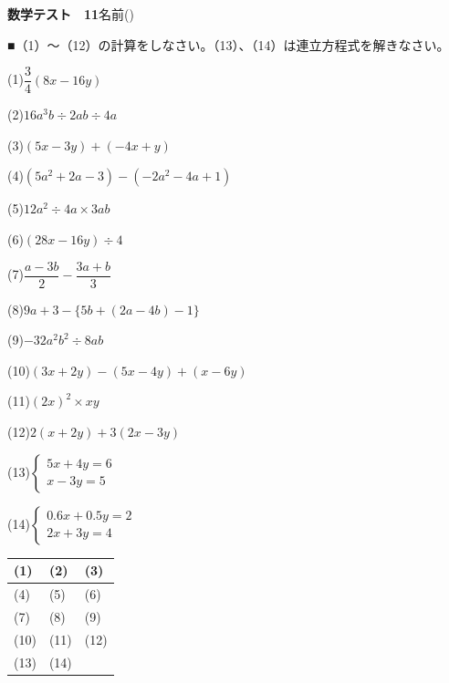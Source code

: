 \documentclass[a4paper,11pt]{ltjsarticle}
\newlength{\qcol}\setlength{\qcol}{0.47\textwidth}
\newlength{\qgap}
\newlength{\anscolw}\setlength{\anscolw}{0.30\textwidth}
\newlength{\ansh}
\newcommand{\Q}[2]{\parbox[t]{\qcol}{\raggedright (#1)\hspace{0.6em}$\displaystyle #2$}}
\newcommand{\QR}[4]{\Q{#1}{#2}\hfill\Q{#3}{#4}\par\vspace{\qgap}}
\newcommand{\anscell}[1]{\rule[-\ansdrop]{0pt}{\ansh}(#1)}
\newlength{\ansdrop}
\begin{document}
{\large\bfseries 数学テスト　11}\hfill 名前(\underline{\hspace{32mm}})\par\vspace{3mm}
■（1）〜（12）の計算をしなさい。（13）、（14）は連立方程式を解きなさい。\par\vspace{3mm}
\setlength{\qgap}{11mm}
\QR{1}{\dfrac{3}{4}(8x-16y)}{2}{16a^3b\div2ab\div4a}
\QR{3}{(5x-3y)+(-4x+y)}{4}{(5a^2+2a-3)-(-2a^2-4a+1)}
\QR{5}{12a^2\div4a\times3ab}{6}{(28x-16y)\div4}
\QR{7}{\dfrac{a-3b}{2}-\dfrac{3a+b}{3}}{8}{9a+3-\{5b+(2a-4b)-1\}}
\QR{9}{-32a^2b^2\div8ab}{10}{(3x+2y)-(5x-4y)+(x-6y)}
\QR{11}{(2x)^2\times xy}{12}{2(x+2y)+3(2x-3y)}
\QR{13}{\left\{\begin{array}{l} 5x+4y=6 \\ x-3y=5 \end{array}\right.}{14}{\left\{\begin{array}{l} 0.6x+0.5y=2 \\ 2x+3y=4 \end{array}\right.}
\vfill
\setlength{\ansh}{12mm}\setlength{\ansdrop}{8mm}%
\begin{center}\begin{tabular}{|p{\anscolw}|p{\anscolw}|p{\anscolw}|}\hline
\anscell{1} & \anscell{2} & \anscell{3} \\\hline
\anscell{4} & \anscell{5} & \anscell{6} \\\hline
\anscell{7} & \anscell{8} & \anscell{9} \\\hline
\anscell{10} & \anscell{11} & \anscell{12} \\\hline
\anscell{13} & \anscell{14} &  \\\hline
\end{tabular}\end{center}
\end{document}
